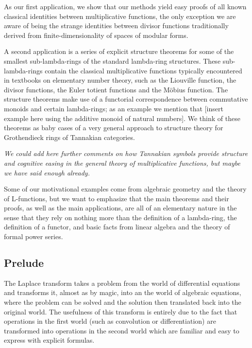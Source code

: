 \documentclass[a4paper]{article}
\begin{document}
As our first application, we show that our methods yield easy proofs of all known classical identities between multiplicative functions, the only exception we are aware of being the strange identities between divisor functions traditionally derived from finite-dimensionality of spaces of modular forms. %

A second application is a series of explicit structure theorems for some of the smallest sub-lambda-rings of the standard lambda-ring structures. These sub-lambda-rings contain the classical multiplicative functions typically encountered in textbooks on elementary number theory, such as the Liouville function, the divisor functions, the Euler totient functions and the M\"obius function. The structure theorems make use of a functorial correspondence between commutative monoids and certain lambda-rings; as an example we mention that [insert example here using the additive monoid of natural numbers]. We think of these theorems as baby cases of a very general approach to structure theory for Grothendieck rings of Tannakian categories.

\emph{We could add here further comments on how Tannakian symbols provide structure and cognitive easing in the general theory of multiplicative functions, but maybe we have said enough already.}

Some of our motivational examples come from algebraic geometry and the theory of L-functions, but we want to emphasize that the main theorems and their proofs, as well as the main applications, are all of an elementary nature in the sense that they rely on nothing more than the definition of a lambda-ring, the definition of a functor, and basic facts from linear algebra and the theory of formal power series.

\subsection{Prelude}

The Laplace transform takes a problem from the world of differential equations and transforms it, almost as by magic, into an the world of algebraic equations, where the problem can be solved and the solution then translated back into the original world. The usefulness of this transform is entirely due to the fact that operations in the first world (such as convolution or differentiation) are transformed into operations in the second world which are familiar and easy to express with explicit formulas.
\end{document}
